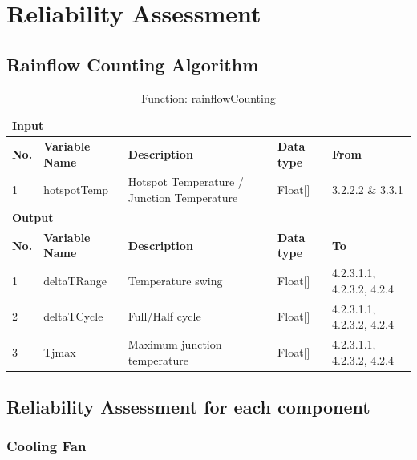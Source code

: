 \documentclass{article}
\begin{document}
\section{Reliability Assessment}
\subsection{Rainflow Counting Algorithm}
\begin{table}[h]
\centering
\caption{Function: rainflowCounting}
\begin{tabular}{|l|l|p{6cm}|l|l|}
\hline
\multicolumn{5}{|l|}{\textbf{Input}} \\ \hline
\textbf{No.} & \textbf{Variable Name} & \textbf{Description} & \textbf{Data type} & \textbf{From} \\ \hline
1 & hotspotTemp & Hotspot Temperature / Junction Temperature & Float[] & 3.2.2.2 \& 3.3.1 \\ \hline
\multicolumn{5}{|l|}{\textbf{Output}} \\ \hline
\textbf{No.} & \textbf{Variable Name} & \textbf{Description} & \textbf{Data type} & \textbf{To} \\ \hline
1 & deltaTRange & Temperature swing & Float[] & 4.2.3.1.1, 4.2.3.2, 4.2.4 \\ \hline
2 & deltaTCycle & Full/Half cycle & Float[] & 4.2.3.1.1, 4.2.3.2, 4.2.4 \\ \hline
3 & Tjmax & Maximum junction temperature & Float[] & 4.2.3.1.1, 4.2.3.2, 4.2.4 \\ \hline
\end{tabular}
\end{table}

\subsection{Reliability Assessment for each component}
\subsubsection{Cooling Fan}
\end{document}
